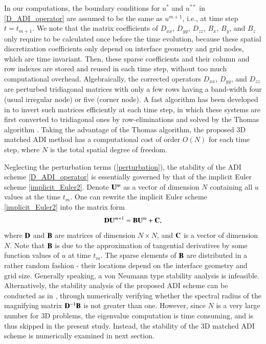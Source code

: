 \documentclass[dissertation]{uathesis}
\begin{document}
\begin{body}
In our computations, the boundary conditions for $u^*$ and $u^{**}$ in \eqref{D_ADI_operator} are assumed to be the same as $u^{m+1}$, i.e., at time step $t=t_{m+1}$. 
We note that the matrix coefficients of $D_{xx}$, $D_{yy}$,  $D_{zz}$, $B_{x}$, $B_{y}$, and $B_{z}$ 
only require to be calculated once before the time evolution, because these spatial discretization coefficients
only depend on interface geometry and grid nodes, which are time invariant. 
Then, these sparse coefficients and their column and row indexes are stored and reused in each time step,
without too much computational overhead. 
Algebraically, the corrected operators $D_{xx}$, $D_{yy}$, and $D_{zz}$ are perturbed tridiagonal matrices
with only a few rows having a band-width four (usual irregular node) or five (corner node). 
A fast algorithm has been developed in \cite{zhao2015matched} to invert such matrices efficiently at each time step,
in which 
these systems are first converted to tridiagonal ones by row-eliminations and solved by the Thomas algorithm \cite{strikwerda2004}. 
Taking the advantage of the Thomas algorithm, the proposed 3D matched ADI method has a computational cost of order $O(N)$ for each time step, where $N$ is the total spatial degree of freedom.



Neglecting the perturbation terms (\ref{perturbation}), the stability of the ADI scheme \eqref{D_ADI_operator} is essentially governed by that of the implicit Euler scheme \eqref{implicit_Euler2}. Denote ${\bf U}^m$ as a vector of dimension $N$ containing all $u$ values at the time $t_m$. One can rewrite  the implicit Euler scheme \eqref{implicit_Euler2} into the matrix form
\begin{equation}
{\bf D} {\bf U}^{m+1} = {\bf B} {\bf U}^m + {\bf C},
\end{equation}
where ${\bf D}$ and ${\bf B}$ are matrices of dimension $N \times N$, and ${\bf C}$ is a vector of dimension $N$. 
Note that ${\bf B}$ is due to the approximation of tangential
derivatives by some function values of $u$ at time $t_m$. The sparse elements of ${\bf B}$ are distributed
in a rather random fashion - their locations depend on the interface geometry and grid size. 
Generally speaking, a von Neumann type stability analysis is infeasible. 
Alternatively, the stability analysis of the proposed ADI scheme can be conducted as in \cite{zhao2015matched},
through numerically verifying whether the spectral radius of the magnifying matrix ${\bf D}^{-1} {\bf B}$ is not greater than one. 
However, since $N$ is a very large number for 3D problems, the eigenvalue computation is time consuming, and is thus skipped in the present study. 
Instead, the stability of the 3D matched ADI scheme is numerically examined in next section.  



\end{body}
\end{document}
